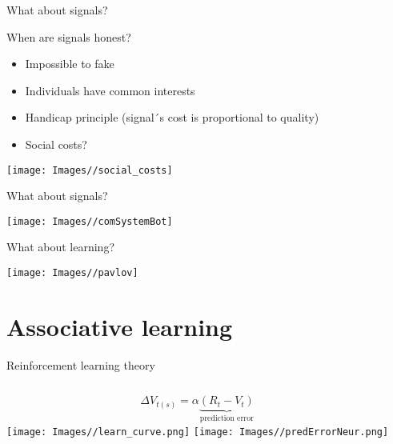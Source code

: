 \documentclass[ignorenonframetext,]{beamer}
\providecommand{\tightlist}{%
  \setlength{\itemsep}{0pt}\setlength{\parskip}{0pt}}
\begin{document}
\begin{frame}{What about signals?}

\begin{block}{When are signals honest?}

\begin{itemize}
\tightlist
\item
  Impossible to fake
\item
  Individuals have common interests
\item
  Handicap principle (signal´s cost is proportional to quality)
\item
  Social costs?
\end{itemize}

\begin{center}\texttt{[image: Images//social\_costs]} \end{center}

\end{block}

\end{frame}

\begin{frame}{What about signals?}

\begin{center}\texttt{[image: Images//comSystemBot]} \end{center}

\end{frame}

\begin{frame}{What about learning?}

\begin{center}\texttt{[image: Images//pavlov]} \end{center}

\end{frame}

\section{Associative learning}\label{associative-learning}

\begin{frame}{Reinforcement learning theory}

\begin{columns}[T]
 \begin{equation*}
  \Delta V_{t(s)}=\alpha \underbrace{(R_t-V_t)}_\text{prediction error}
  \end{equation*}
  \pause
  \texttt{[image: Images//learn\_curve.png]}
  \pause
  \texttt{[image: Images//predErrorNeur.png]}
\end{columns}

\end{frame}
\end{document}
